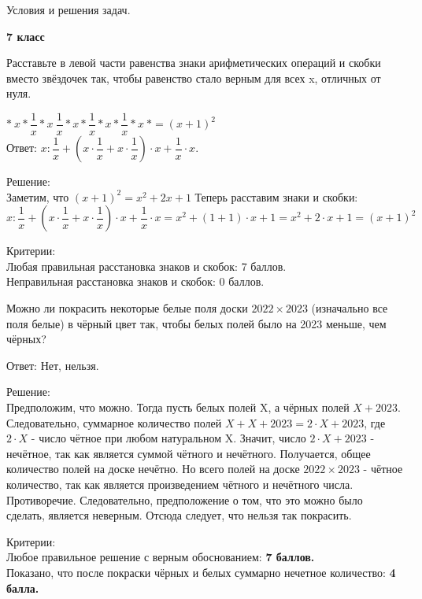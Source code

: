 \centerline{\Huge Условия и решения задач.}
\centerline{\bf \Huge 7 класс}

Расставьте в левой части равенства знаки арифметических операций и скобки вместо звёздочек так, чтобы равенство стало верным для всех x, отличных от нуля.

$* \ x  * \dfrac{1}{x} * x \ \dfrac{1}{x} * x * \dfrac{1}{x} * x * \dfrac{1}{x} * x \ * = (x+1)^2$\\

Ответ: $x:\dfrac{1}{x} + (x \cdot \dfrac{1}{x} + x \cdot \dfrac{1}{x}) \cdot x + \dfrac{1}{x} \cdot x.$

Решение:\\
Заметим, что $(x+1)^2 = x^2 + 2x + 1$
Теперь расставим знаки и скобки:
$x:\dfrac{1}{x}+ (x\cdot\dfrac{1}{x} + x\cdot\dfrac{1}{x})\cdot x + \dfrac{1}{x}\cdot x = x^2 + (1+1)\cdot x + 1 = x^2 + 2\cdot x + 1 = (x+1)^2$

\hspace{3mm}

Критерии:\\
Любая правильная расстановка знаков и скобок: 7 баллов.\\
Неправильная расстановка знаков и скобок: 0 баллов.

\hspace{3mm}

Можно ли покрасить некоторые белые поля доски $2022\times2023$ (изначально все поля белые) в чёрный цвет так, чтобы белых полей было на 2023 меньше, чем чёрных?

\hspace{3mm}

Ответ: Нет, нельзя.

Решение:\\
Предположим, что можно. Тогда пусть белых полей X, а чёрных полей $X + 2023$. Следовательно, суммарное количество полей $X + X + 2023 = 2\cdot X + 2023$, 
где $2\cdot X$ - число чётное при любом натуральном X. 
Значит, число $2\cdot X + 2023$ - нечётное, так как является суммой чётного и нечётного. Получается, общее количество полей на доске нечётно. Но всего полей на доске $2022\times2023$ - чётное количество, так как является произведением чётного и нечётного числа. Противоречие. Следовательно, предположение о том, что это можно было сделать, является неверным. Отсюда следует, что нельзя так покрасить. 

\hspace{3mm}

Критерии:\\
Любое правильное решение с верным обоснованием: \textbf{7 баллов.}\\
Показано, что после покраски чёрных и белых суммарно нечетное количество: \textbf{4 балла.}

